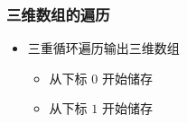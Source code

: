 \begin{frame}[fragile]
    \frametitle{三维数组的遍历}

        \begin{itemize}
            \item 三重循环遍历输出三维数组

                \begin{itemize}
                    \item<2-> 从下标 $0$ 开始储存
                    \item<4-> 从下标 $1$ 开始储存
                \end{itemize}
        \end{itemize}
\end{frame}

